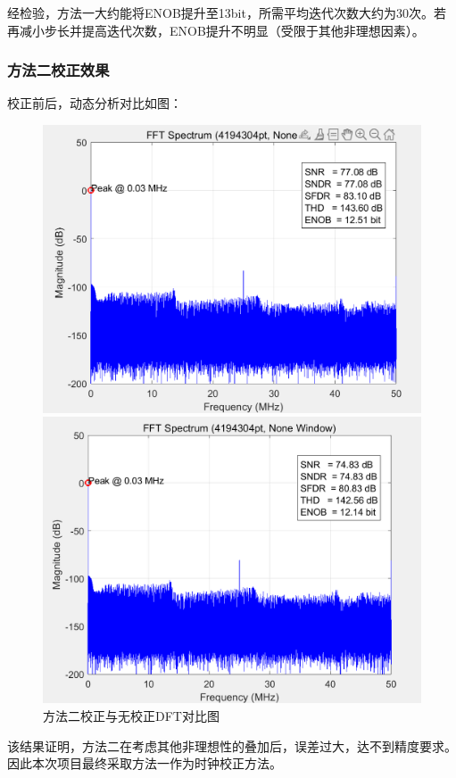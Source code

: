 \documentclass[cs4size,a4paper]{ctexart}
\numberwithin{equation}{section}
\numberwithin{table}{section}
\numberwithin{figure}{section}
\begin{document}
			经检验，方法一大约能将ENOB提升至13bit，所需平均迭代次数大约为30次。若再减小步长并提高迭代次数，ENOB提升不明显（受限于其他非理想因素）。

		\subsubsection{方法二校正效果}

		校正前后，动态分析对比如图：

			\begin{figure}[H]
				\centering
				\begin{minipage}{0.49\linewidth}
					\centering
					\includegraphics[width=0.9\linewidth]{figure/COR_FFT1.png}
				\end{minipage}
				\begin{minipage}{0.49\linewidth}
					\centering
					\includegraphics[width=0.9\linewidth]{figure/COR_FFT2.png}
				\end{minipage}
				\caption{方法二校正与无校正DFT对比图} 
			\end{figure}
			该结果证明，方法二在考虑其他非理想性的叠加后，误差过大，达不到精度要求。因此本次项目最终采取方法一作为时钟校正方法。
\end{document}

